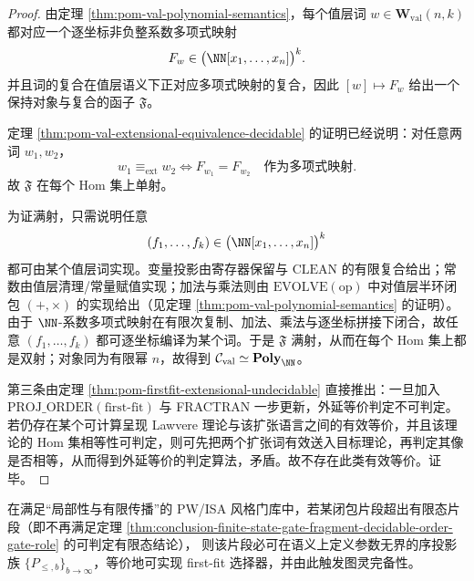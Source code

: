 \begin{proof}
由定理 \ref{thm:pom-val-polynomial-semantics}，每个值层词 \(w\in\mathbf{W}_{\mathrm{val}}(n,k)\) 都对应一个逐坐标非负整系数多项式映射
\[
F_w\in\bigl(\NN[x_1,\dots,x_n]\bigr)^k.
\]
并且词的复合在值层语义下正对应多项式映射的复合，因此 \([w]\mapsto F_w\) 给出一个保持对象与复合的函子 \(\mathfrak F\)。

定理 \ref{thm:pom-val-extensional-equivalence-decidable} 的证明已经说明：对任意两词 \(w_1,w_2\)，
\[
w_1\equiv_{\mathrm{ext}} w_2
\iff
F_{w_1}=F_{w_2}
\quad\text{作为多项式映射}.
\]
故 \(\mathfrak F\) 在每个 Hom 集上单射。

为证满射，只需说明任意
\[
(f_1,\dots,f_k)\in\bigl(\NN[x_1,\dots,x_n]\bigr)^k
\]
都可由某个值层词实现。变量投影由寄存器保留与 \(\mathrm{CLEAN}\) 的有限复合给出；常数由值层清理/常量赋值实现；加法与乘法则由 \(\mathrm{EVOLVE}(\mathrm{op})\) 中对值层半环闭包 \((+,\times)\) 的实现给出（见定理 \ref{thm:pom-val-polynomial-semantics} 的证明）。由于 \(\NN\)-系数多项式映射在有限次复制、加法、乘法与逐坐标拼接下闭合，故任意 \((f_1,\dots,f_k)\) 都可逐坐标编译为某个词。于是 \(\mathfrak F\) 满射，从而在每个 Hom 集上都是双射；对象同为有限幂 \(n\)，故得到 \(\mathcal C_{\mathrm{val}}\simeq \mathbf{Poly}_{\NN}\)。

第三条由定理 \ref{thm:pom-firstfit-extensional-undecidable} 直接推出：一旦加入 \(\mathrm{PROJ\_ORDER}(\text{first-fit})\) 与 FRACTRAN 一步更新，外延等价判定不可判定。若仍存在某个可计算呈现 Lawvere 理论与该扩张语言之间的有效等价，并且该理论的 Hom 集相等性可判定，则可先把两个扩张词有效送入目标理论，再判定其像是否相等，从而得到外延等价的判定算法，矛盾。故不存在此类有效等价。证毕。
\end{proof}

\begin{conjecture}[非有限态片段的最小序投影判据]\label{conj:conclusion-minimal-non-finite-state-order-projection}
在满足“局部性与有限传播”的 PW/ISA 风格门库中，若某闭包片段超出有限态片段（即不再满足定理 \ref{thm:conclusion-finite-state-gate-fragment-decidable-order-gate-role} 的可判定有限态结论），
则该片段必可在语义上定义参数无界的序投影族 \(\{P_{\le,b}\}_{b\to\infty}\)，等价地可实现 first-fit 选择器，并由此触发图灵完备性。
\end{conjecture}
